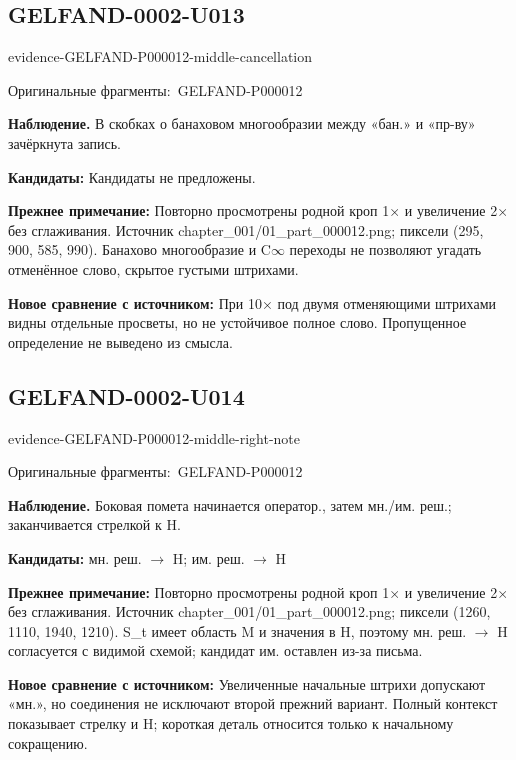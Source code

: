 \documentclass[11pt]{article}
\newcommand{\EvidenceBlock}[4]{%
 \par\smallskip\noindent\begin{minipage}{\linewidth}
 \begin{minipage}[t]{.47\linewidth}\vspace{0pt}\centering
 \csname evidence-#1-#2\endcsname\par
 {\scriptsize\SourceCropCaption\ #1}\par
 \end{minipage}\hfill
 \begin{minipage}[t]{.49\linewidth}\vspace{0pt}\raggedright
 {\small\color{orange!65!black}\textbf{#4} #3}\par
 \end{minipage}
 \end{minipage}\par\smallskip}
\newcommand{\SourceCropCaption}{Оригинальные фрагменты:}\newcommand{\ReadingCaption}{Сомнительное чтение.}\newcommand{\IncompleteCaption}{Неразобранный фрагмент.}\newcommand{\DiagramCaption}{Рисунок и набранное описание.}
\begin{document}
\subsection*{GELFAND-0002-U013}
\EvidenceBlock{GELFAND-P000012}{middle-cancellation}{В скобках о банаховом многообразии между «бан.» и «пр-ву» зачёркнута запись.}{Наблюдение.}
\par\smallskip\noindent\textbf{Кандидаты: } Кандидаты не предложены.\par
\par\smallskip\noindent\textbf{Прежнее примечание: } Повторно просмотрены родной кроп 1× и увеличение 2× без сглаживания. Источник chapter\_001/01\_part\_000012.png; пиксели (295, 900, 585, 990). Банахово многообразие и C\(\infty\) переходы не позволяют угадать отменённое слово, скрытое густыми штрихами.\par
\par\smallskip\noindent\textbf{Новое сравнение с источником: } При 10× под двумя отменяющими штрихами видны отдельные просветы, но не устойчивое полное слово. Пропущенное определение не выведено из смысла.\par

\subsection*{GELFAND-0002-U014}
\EvidenceBlock{GELFAND-P000012}{middle-right-note}{Боковая помета начинается оператор., затем мн./им. реш.; заканчивается стрелкой к H.}{Наблюдение.}
\par\smallskip\noindent\textbf{Кандидаты: } мн. реш. \(\to\) H; им. реш. \(\to\) H\par
\par\smallskip\noindent\textbf{Прежнее примечание: } Повторно просмотрены родной кроп 1× и увеличение 2× без сглаживания. Источник chapter\_001/01\_part\_000012.png; пиксели (1260, 1110, 1940, 1210). S\_t имеет область M и значения в H, поэтому мн. реш. \(\to\) H согласуется с видимой схемой; кандидат им. оставлен из-за письма.\par
\par\smallskip\noindent\textbf{Новое сравнение с источником: } Увеличенные начальные штрихи допускают «мн.», но соединения не исключают второй прежний вариант. Полный контекст показывает стрелку и H; короткая деталь относится только к начальному сокращению.\par
\end{document}
